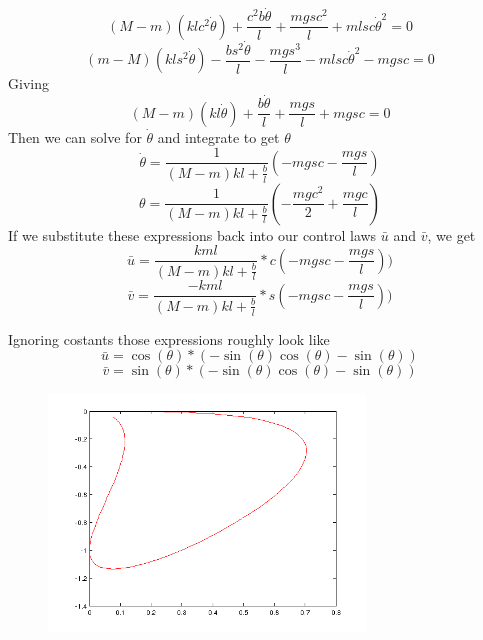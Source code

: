 \documentclass{article}
\begin{document}
$$
(M-m)(klc^2\dot{\theta}) + \frac{c^2b\dot{\theta}}{l} + \frac{mgsc^2}{l} + mlsc\dot{\theta}^2 = 0
$$
$$
(m-M)(kls^2\dot{\theta}) - \frac{bs^2\dot{\theta}}{l} -\frac{mgs^3}{l} - mlsc\dot{\theta}^2 - mgsc = 0
$$
\noindent
Giving
$$
(M-m)(kl\dot{\theta}) + \frac{b\dot{\theta}}{l} + \frac{mgs}{l} + mgsc = 0
$$
\noindent
Then we can solve for $\dot{\theta}$ and integrate to get $\theta$
$$
\dot{\theta} = \frac{1}{(M-m)kl + \frac{b}{l}}(-mgsc - \frac{mgs}{l})
$$
$$
\theta = \frac{1}{(M-m)kl + \frac{b}{l}} (-\frac{mgc^2}{2} +\frac{mgc}{l})
$$
\noindent
If we substitute these expressions back into our control laws $\bar{u}$ and $\bar{v}$, we get
$$
\bar{u} =  \frac{kml}{(M-m)kl + \frac{b}{l}} * c(-mgsc - \frac{mgs}{l}))
$$
$$
\bar{v} = \frac{-kml}{(M-m)kl + \frac{b}{l}} *  s(-mgsc - \frac{mgs}{l}))
$$

\noindent
Ignoring costants those expressions roughly look like
$$
\bar{u} = \cos(\theta) * (-\sin(\theta)\cos(\theta)-\sin(\theta))
$$
$$
\bar{v} = \sin(\theta) * (-\sin(\theta)\cos(\theta)-\sin(\theta))
$$

\begin{figure}[h!]
  \centering
  \includegraphics[width=0.75\textwidth]{curve2.png}
  \caption{}
\end{figure}


\end{document}
